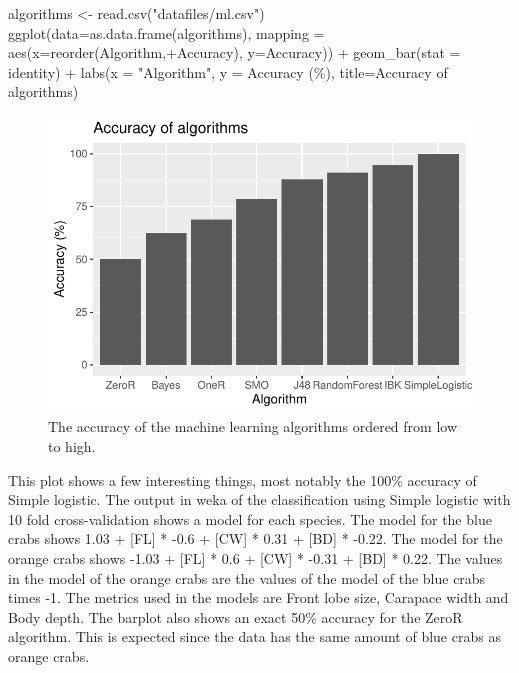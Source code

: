 \documentclass[
]{article}
\newenvironment{Shaded}{}{}
\newcommand{\AttributeTok}[1]{#1}
\newcommand{\FunctionTok}[1]{#1}
\newcommand{\NormalTok}[1]{#1}
\newcommand{\OtherTok}[1]{\textcolor[rgb]{1.00,0.25,0.00}{#1}}
\newcommand{\SpecialCharTok}[1]{\textcolor[rgb]{0.00,0.50,0.50}{#1}}
\newcommand{\StringTok}[1]{\textcolor[rgb]{0.00,0.50,0.50}{#1}}
\begin{document}
\begin{Shaded}
\begin{Highlighting}[]
\NormalTok{algorithms }\OtherTok{\textless{}{-}} \FunctionTok{read.csv}\NormalTok{(}\StringTok{"datafiles/ml.csv"}\NormalTok{)}
\FunctionTok{ggplot}\NormalTok{(}\AttributeTok{data=}\FunctionTok{as.data.frame}\NormalTok{(algorithms), }\AttributeTok{mapping =} \FunctionTok{aes}\NormalTok{(}\AttributeTok{x=}\FunctionTok{reorder}\NormalTok{(Algorithm,}\SpecialCharTok{+}\NormalTok{Accuracy), }\AttributeTok{y=}\NormalTok{Accuracy)) }\SpecialCharTok{+}
  \FunctionTok{geom\_bar}\NormalTok{(}\AttributeTok{stat =} \StringTok{\textquotesingle{}identity\textquotesingle{}}\NormalTok{) }\SpecialCharTok{+}
  \FunctionTok{labs}\NormalTok{(}\AttributeTok{x =} \StringTok{"Algorithm"}\NormalTok{, }\AttributeTok{y =} \StringTok{\textquotesingle{}Accuracy (\%)\textquotesingle{}}\NormalTok{, }\AttributeTok{title=}\StringTok{\textquotesingle{}Accuracy of algorithms\textquotesingle{}}\NormalTok{)}
\end{Highlighting}
\end{Shaded}

\begin{figure}[H]

{\centering \includegraphics{Log_files/figure-latex/ml-1} 

}

\caption{The accuracy of the machine learning algorithms ordered from low to high.}\label{fig:ml}
\end{figure}

This plot shows a few interesting things, most notably the 100\%
accuracy of Simple logistic. The output in weka of the classification
using Simple logistic with 10 fold cross-validation shows a model for
each species. The model for the blue crabs shows 1.03 + {[}FL{]} * -0.6
+ {[}CW{]} * 0.31 + {[}BD{]} * -0.22. The model for the orange crabs
shows -1.03 + {[}FL{]} * 0.6 + {[}CW{]} * -0.31 + {[}BD{]} * 0.22. The
values in the model of the orange crabs are the values of the model of
the blue crabs times -1. The metrics used in the models are Front lobe
size, Carapace width and Body depth. The barplot also shows an exact
50\% accuracy for the ZeroR algorithm. This is expected since the data
has the same amount of blue crabs as orange crabs.
\end{document}
